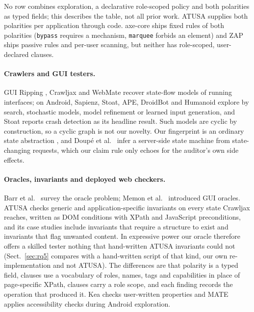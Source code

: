 No row combines exploration, a declarative role-scoped policy and both polarities
as typed fields; this describes the table, not all prior work. ATUSA supplies both
polarities per application through code. axe-core ships fixed rules of both
polarities (\texttt{bypass} requires a mechanism, \texttt{marquee} forbids an
element) and ZAP ships passive rules and per-user scanning, but neither has
role-scoped, user-declared clauses.

\paragraph{Crawlers and GUI testers.}
GUI Ripping \cite{memon2003ripping}, Crawljax \cite{mesbah2012crawljax} and WebMate
\cite{dallmeier2013webmate} recover state-flow models of running interfaces; on
Android, Sapienz, Stoat, APE, DroidBot and Humanoid
\cite{mao2016sapienz,su2017stoat,gu2019ape,li2017droidbot,li2019humanoid} explore
by search, stochastic models, model refinement or learned input generation, and
Stoat reports crash detection as its headline result. Such models are cyclic by
construction, so a cyclic graph is not our novelty. Our fingerprint is an ordinary
state abstraction \cite{yandrapally2020nearduplicate}, and Doup\'e et al.\
\cite{doupe2012enemy} infer a server-side state machine from state-changing
requests, which our claim rule only echoes for the auditor's own side effects.

\paragraph{Oracles, invariants and deployed web checkers.}
Barr et al.\ \cite{barr2015oracle} survey the oracle problem; Memon et al.\
\cite{memon2000oracles} introduced GUI oracles. ATUSA \cite{mesbah2012invariant}
checks generic and application-specific invariants on every state Crawljax
reaches, written as DOM conditions with XPath and JavaScript preconditions, and
its case studies include invariants that require a structure to exist and
invariants that flag unwanted content. In expressive power our oracle therefore
offers a skilled tester nothing that hand-written ATUSA invariants could not
(Sect.~\ref{sec:rq5} compares with a hand-written script of that kind, our own
re-implementation and not ATUSA). The differences are that polarity is a typed
field, clauses use a vocabulary of roles, names, tags and capabilities in place of
page-specific XPath, clauses carry a role scope, and each finding records the
operation that produced it. Kea \cite{xiong2024kea} checks user-written properties
and MATE \cite{eler2018mate} applies accessibility checks during Android
exploration.

